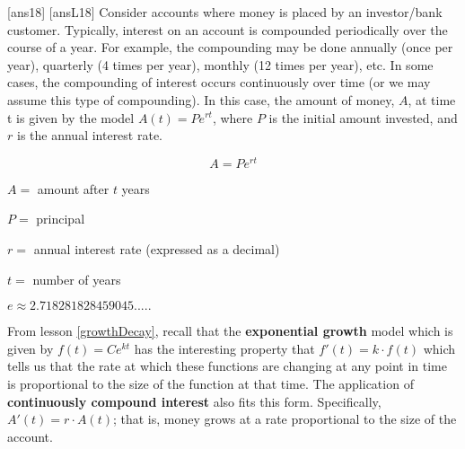 \newpage
[ans18]
[ansL18]
\noindent  Consider accounts where money is placed by an investor/bank customer.  Typically, interest on an account is compounded periodically over the course of a year.  For example, the compounding may be done annually (once per year), quarterly (4 times per year), monthly (12 times per year), etc.  In some cases, the compounding of interest occurs continuously over time (or we may assume this type of compounding).  In this case, the amount of money, $A$, at time t is given by the model $A(t)=Pe^{rt}$, where $P$ is the initial amount invested, and $r$ is the annual interest rate.   \\ 

\begin{tcolorbox}[title = {Continuous Compound Interest Formula}]

$$A = Pe^{rt}$$

$A = $ amount after $t$ years

$P=$ principal

$r=$ annual interest rate (expressed as a decimal)

$t=$ number of years

$e \approx 2.718281828459045.....$

\end{tcolorbox}
\noindent From lesson \ref{growthDecay}, recall that the \textbf{exponential growth} model which is given by $f(t)=Ce^{kt}$ has the interesting property that $f'(t)=k\cdot f(t)$ which tells us that the rate at which these functions are changing at any point in time is proportional to the size of the function at that time. The application of \textbf{continuously compound interest} also fits this form. Specifically, $A' (t)=r\cdot A(t)$; that is, money grows at a rate proportional to the size of the account. 

